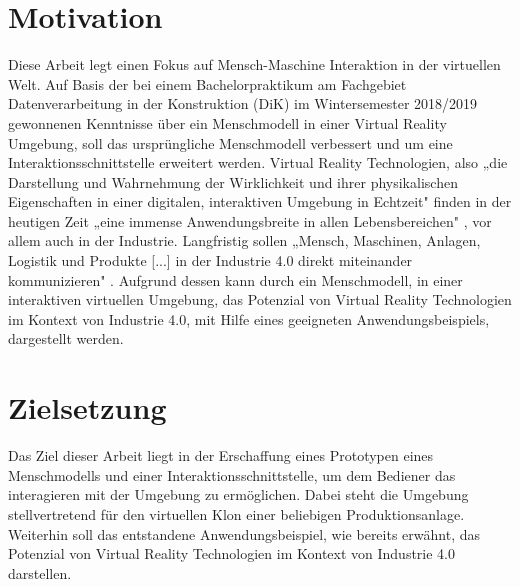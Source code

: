 \section{Motivation}\label{sec:Motivation}
Diese Arbeit legt einen Fokus auf Mensch-Maschine Interaktion in der virtuellen Welt. Auf Basis der bei einem Bachelorpraktikum am Fachgebiet Datenverarbeitung in der Konstruktion (DiK) im Wintersemester 2018/2019 gewonnenen Kenntnisse über ein Menschmodell in einer Virtual Reality Umgebung, soll das ursprüngliche Menschmodell verbessert und um eine Interaktionsschnittstelle erweitert werden.
\newline\newline
Virtual Reality Technologien, also „die Darstellung und Wahrnehmung der Wirklichkeit und ihrer physikalischen Eigenschaften in einer digitalen, interaktiven Umgebung in Echtzeit" \cite[S.1]{4} finden in der heutigen Zeit „eine immense Anwendungsbreite in allen Lebensbereichen" \cite[S.1]{4}, vor allem auch in der Industrie. Langfristig sollen „Mensch, Maschinen, Anlagen, Logistik und Produkte [...] in der Industrie 4.0 direkt miteinander kommunizieren" \cite[S.2]{4}.
\newline\newline
Aufgrund dessen kann durch ein Menschmodell, in einer interaktiven virtuellen Umgebung, das Potenzial von Virtual Reality Technologien im Kontext von Industrie 4.0, mit Hilfe eines geeigneten Anwendungsbeispiels, dargestellt werden.

\section{Zielsetzung}\label{sec:Zielsetzung}
Das Ziel dieser Arbeit liegt in der Erschaffung eines Prototypen eines Menschmodells und einer Interaktionsschnittstelle, um dem Bediener das interagieren mit der Umgebung zu ermöglichen. Dabei steht die Umgebung stellvertretend für den virtuellen Klon einer beliebigen Produktionsanlage. Weiterhin soll das entstandene Anwendungsbeispiel, wie bereits erwähnt, das Potenzial von Virtual Reality Technologien im Kontext von Industrie 4.0 darstellen.

